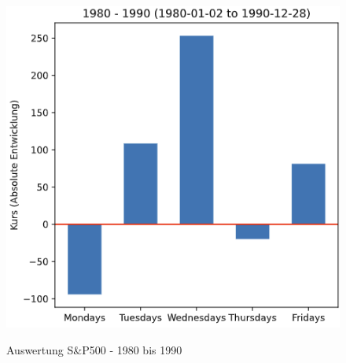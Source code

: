 \begin{figure}[!htb]
    \centering
    \begin{minipage}[t]{0.5\textwidth}
        \caption[]{Auswertung S\&P500 - 1980 bis 1990}
        \includegraphics[width=1\textwidth]{img/Auswertung_SP500_1980-1990.PNG}\\
        \label{fig:ausw_sp500_1980_1990}
    \end{minipage}
\end{figure}

